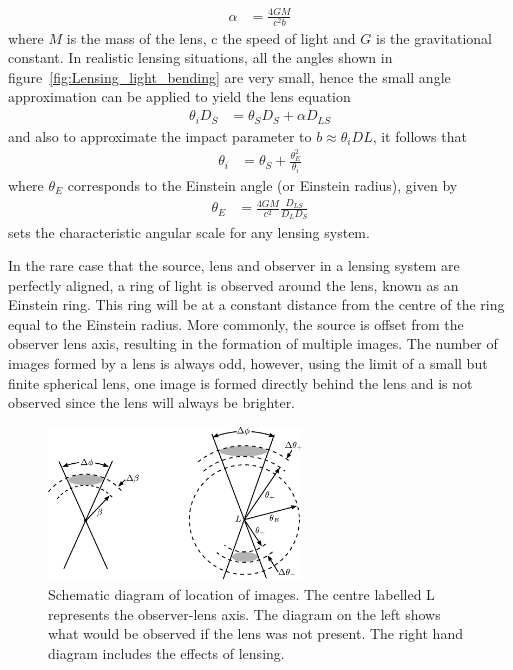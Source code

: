         \begin{align}
            \alpha &= \frac{4GM}{c^2 b}
        \end{align}
        where $M$ is the mass of the lens, c the speed of light and $G$ is the gravitational constant. In realistic lensing situations, all the angles shown in figure~\ref{fig:Lensing_light_bending} are very small, hence the small angle approximation can be applied to yield the lens equation
        \begin{align}
            \theta_i D_S &= \theta_S D_S + \alpha D_{LS}
        \end{align}
        and also to approximate the impact parameter to $b\approx\theta_i DL$, it follows that
        \begin{align}
            \theta_i &= \theta_S + \frac{\theta_E^2}{\theta_i} \label{eq:einstein_angle}
        \end{align}
        where $\theta_E$ corresponds to the Einstein angle (or Einstein radius), given by
        \begin{align}
            \theta_E &= \frac{4GM}{c^2}\frac{D_{LS}}{D_L D_S}
        \end{align}
        sets the characteristic angular scale for any lensing system\cite{Hartle}.

        In the rare case that the source, lens and observer in a lensing system are perfectly aligned, a ring of light is observed around the lens, known as an Einstein ring. This ring will be at a constant distance from the centre of the ring equal to the Einstein radius. More commonly, the source is offset from the observer lens axis, resulting in the formation of multiple images. The number of images formed by a lens is always odd, however, using the limit of a small but finite spherical lens, one image is formed directly behind the lens and is not observed since the lens will always be brighter.
        \begin{figure}[ht]
            \centering
                \includegraphics[width=0.6\textwidth]{../Images/Lensing_image_positions2.pdf}
                \caption[Schematic diagram of location of images]{Schematic diagram of location of images. The centre labelled L represents the observer-lens axis. The diagram on the left shows what would be observed if the lens was not present. The right hand diagram includes the effects of lensing\cite{Hartle}.\label{fig:Lensing_image_positions2}}
        \end{figure}

